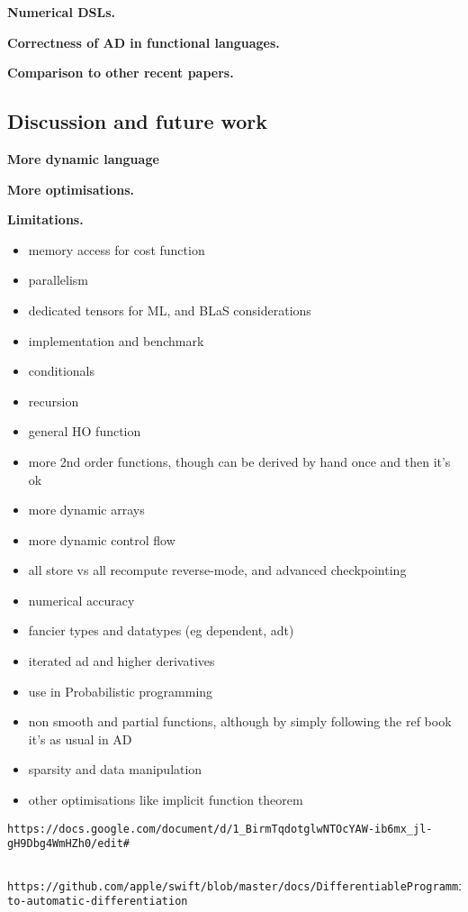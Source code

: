 \noindent \textbf{Numerical DSLs.} 

\noindent \textbf{Correctness of AD in functional languages.}

\noindent \textbf{Comparison to other recent papers.}

\subsection{Discussion and future work} %
\label{sub:discussion_and_future_work}

\noindent \textbf{More dynamic language}

\noindent \textbf{More optimisations.}

\noindent \textbf{Limitations.}
\begin{itemize}
    \item memory access for cost function 
    \item parallelism
    \item dedicated tensors for ML, and BLaS considerations
    \item implementation and benchmark
    \item conditionals
    \item recursion
    \item general HO function
    \item more 2nd order functions, though can be derived by hand once and then it's ok
    \item more dynamic arrays
    \item more dynamic control flow
    \item all store vs all recompute reverse-mode, and advanced checkpointing
    \item numerical accuracy
    \item fancier types and datatypes (eg dependent, adt) 
    \item iterated ad and higher derivatives
    \item use in Probabilistic programming
    \item non smooth and partial functions, although by simply following the ref book it's as usual in AD
    \item sparsity and data manipulation
    \item other optimisations like implicit function theorem
\end{itemize}

\begin{verbatim}https://docs.google.com/document/d/1_BirmTqdotglwNTOcYAW-ib6mx_jl-gH9Dbg4WmHZh0/edit# \end{verbatim}
\begin{verbatim}
	https://github.com/apple/swift/blob/master/docs/DifferentiableProgramming.md#approaches-to-automatic-differentiation
\end{verbatim}

